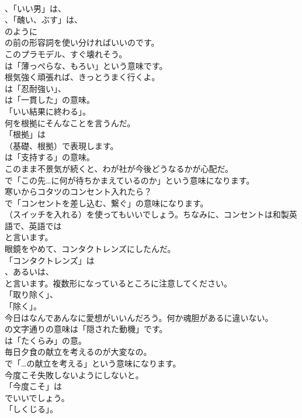 \documentclass[8pt]{extreport}
\begin{document}
\begin{CJK}{UTF8}{min}
\\	、「いい男」は、
\\	、「醜い、ぶす」は、
\\	のように
\\	の前の形容詞を使い分ければいいのです。	
\\	このプラモデル、すぐ壊れそう。 
\\	は「薄っぺらな、もろい」という意味です。	
\\	根気強く頑張れば、きっとうまく行くよ。 
\\	は「忍耐強い」、
\\	は「一貫した」の意味。
\\	「いい結果に終わる」。	
\\	何を根拠にそんなことを言うんだ。 
\\	「根拠」は
\\	（基礎、根拠）で表現します。
\\	は「支持する」の意味。	
\\	このまま不景気が続くと、わが社が今後どうなるかが心配だ。 
\\	で「この先…に何が待ちかまえているのか」という意味になります。	
\\	寒いからコタツのコンセント入れたら？ 
\\	で「コンセントを差し込む、繋ぐ」の意味になります。
\\	（スイッチを入れる）を使ってもいいでしょう。ちなみに、コンセントは和製英語で、英語では
\\	と言います。	
\\	眼鏡をやめて、コンタクトレンズにしたんだ。 
\\	「コンタクトレンズ」は
\\	、あるいは、
\\	と言います。複数形になっているところに注意してください。
\\	「取り除く」、
\\	「除く」。	
\\	今日はなんであんなに愛想がいいんだろう。何か魂胆があるに違いない。 
\\	の文字通りの意味は「隠された動機」です。
\\	は「たくらみ」の意。	
\\	毎日夕食の献立を考えるのが大変なの。 
\\	で「…の献立を考える」という意味になります。	
\\	今度こそ失敗しないようにしないと。 
\\	「今度こそ」は
\\	でいいでしょう。
\\	「しくじる」。	

\end{CJK}
\end{document}
